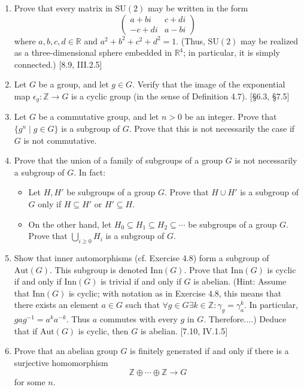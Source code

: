\begin{enumerate}
    \item Prove that every matrix in $\text{SU}(2)$ may be written in the form
          \[ \begin{pmatrix} a+bi & c+di \\ -c+di & a-bi \end{pmatrix} \]
          where $a, b, c, d \in \mathbb{R}$ and $a^2+b^2+c^2+d^2=1$. (Thus, $\text{SU}(2)$ may be realized as a three-dimensional sphere embedded in $\mathbb{R}^4$; in particular, it is simply connected.) [8.9, III.2.5]

    \item Let $G$ be a group, and let $g \in G$. Verify that the image of the exponential map $\epsilon_g: \mathbb{Z} \to G$ is a cyclic group (in the sense of Definition 4.7). [\S6.3, \S7.5]

    \item Let $G$ be a commutative group, and let $n > 0$ be an integer. Prove that $\{g^n \mid g \in G\}$ is a subgroup of $G$. Prove that this is not necessarily the case if $G$ is not commutative.

    \item Prove that the union of a family of subgroups of a group $G$ is not necessarily a subgroup of $G$. In fact:
          \begin{itemize}
              \item Let $H, H'$ be subgroups of a group $G$. Prove that $H \cup H'$ is a subgroup of $G$ only if $H \subseteq H'$ or $H' \subseteq H$.
              \item On the other hand, let $H_0 \subseteq H_1 \subseteq H_2 \subseteq \cdots$ be subgroups of a group $G$. Prove that $\bigcup_{i \ge 0} H_i$ is a subgroup of $G$.
          \end{itemize}

    \item Show that inner automorphisms (cf. Exercise 4.8) form a subgroup of $\text{Aut}(G)$. This subgroup is denoted $\text{Inn}(G)$. Prove that $\text{Inn}(G)$ is cyclic if and only if $\text{Inn}(G)$ is trivial if and only if $G$ is abelian. (Hint: Assume that $\text{Inn}(G)$ is cyclic; with notation as in Exercise 4.8, this means that there exists an element $a \in G$ such that $\forall g \in G \exists k \in \mathbb{Z}: \gamma_g = \gamma_a^k$. In particular, $gag^{-1} = a^k a^{-k}$. Thus $a$ commutes with every $g$ in $G$. Therefore....) Deduce that if $\text{Aut}(G)$ is cyclic, then $G$ is abelian. [7.10, IV.1.5]

    \item Prove that an abelian group $G$ is finitely generated if and only if there is a surjective homomorphism
          \[ \mathbb{Z} \oplus \cdots \oplus \mathbb{Z} \to G \]
          for some $n$.


\end{enumerate}
